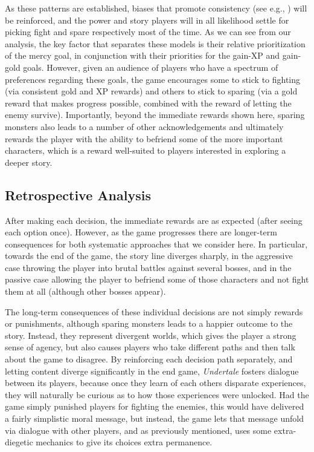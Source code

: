 \documentclass[arts,article,submit,moreauthors,pdftex,10pt,a4paper]{Definitions/mdpi}
\begin{document}
As these patterns are established, biases that promote consistency (see e.g., \cite{brehm1956postdecision,mather2000misremembrance,hall2012lifting}) will be reinforced, and the power and story players will in all likelihood settle for picking fight and spare respectively most of the time.
%
As we can see from our analysis, the key factor that separates these models is their relative prioritization of the mercy goal, in conjunction with their priorities for the gain-XP and gain-gold goals.
%
However, given an audience of players who have a spectrum of preferences regarding these goals, the game encourages some to stick to fighting (via consistent gold and XP rewards) and others to stick to sparing (via a gold reward that makes progress possible, combined with the reward of letting the enemy survive).
%
Importantly, beyond the immediate rewards shown here, sparing monsters also leads to a number of other acknowledgements and ultimately rewards the player with the ability to befriend some of the more important characters, which is a reward well-suited to players interested in exploring a deeper story.


\subsection{Retrospective Analysis}

After making each decision, the immediate rewards are as expected (after seeing each option once).
%
However, as the game progresses there are longer-term consequences for both systematic approaches that we consider here.
%
In particular, towards the end of the game, the story line diverges sharply, in the aggressive case throwing the player into brutal battles against several bosses, and in the passive case allowing the player to befriend some of those characters and not fight them at all (although other bosses appear).


The long-term consequences of these individual decisions are not simply rewards or punishments, although sparing monsters leads to a happier outcome to the story.
%
Instead, they represent divergent worlds, which gives the player a strong sense of agency, but also causes players who take different paths and then talk about the game to disagree.
%
By reinforcing each decision path separately, and letting content diverge significantly in the end game, \emph{Undertale} fosters dialogue between its players, because once they learn of each others disparate experiences, they will naturally be curious as to how those experiences were unlocked.
%
Had the game simply punished players for fighting the enemies, this would have delivered a fairly simplistic moral message, but instead, the game lets that message unfold via dialogue with other players, and as previously mentioned, uses some extra-diegetic mechanics to give its choices extra permanence.
\end{document}
